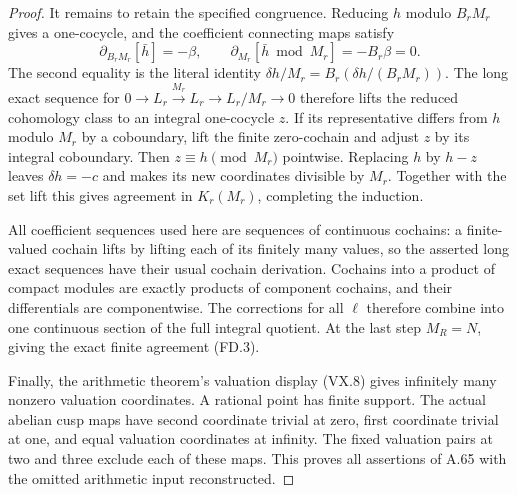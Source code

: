 \begin{proof}
It remains to retain the specified
congruence. Reducing \(h\) modulo
\(B_rM_r\) gives a one-cocycle, and
the coefficient connecting maps satisfy
\[
 \partial_{B_rM_r}[\bar h]=-\beta,
 \qquad
 \partial_{M_r}[\bar h\bmod M_r]
                    =-B_r\beta=0.
 \tag{FD.15}
\]
The second equality is the literal
identity \(\delta h/M_r
       =B_r(\delta h/(B_rM_r))\).
The long exact sequence for
\(0\to L_r\xrightarrow{M_r}L_r\to L_r/M_r\to0\)
therefore lifts the reduced cohomology
class to an integral one-cocycle \(z\).
If its representative differs from
\(h\) modulo \(M_r\) by a coboundary,
lift the finite zero-cochain and adjust
\(z\) by its integral coboundary.
Then \(z\equiv h\pmod{M_r}\) pointwise.
Replacing \(h\) by \(h-z\) leaves
\(\delta h=-c\) and makes its new
coordinates divisible by \(M_r\).
Together with the set lift this gives
agreement in \(K_r(M_r)\), completing
the induction.

All coefficient sequences used here
are sequences of continuous cochains:
a finite-valued cochain lifts by lifting
each of its finitely many values, so
the asserted long exact sequences have
their usual cochain derivation. Cochains
into a product of compact modules are
exactly products of component cochains,
and their differentials are componentwise.
The corrections for all \(\ell\)
therefore combine into one continuous
section of the full integral quotient.
At the last step \(M_R=N\), giving
the exact finite agreement (FD.3).

Finally, the arithmetic theorem's
valuation display (VX.8)
gives infinitely many nonzero valuation
coordinates. A rational point has finite
support. The actual abelian cusp maps
have second coordinate trivial at zero,
first coordinate trivial at one, and
equal valuation coordinates at infinity.
The fixed valuation pairs at two and
three exclude each of these maps.
This proves all assertions of A.65 with
the omitted arithmetic input reconstructed.
\end{proof}
